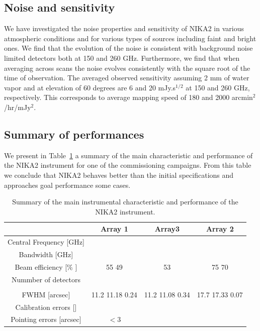 \documentclass[]{aa} %
\begin{document}
\subsection{Noise and sensitivity}
\label{Noise and sensitivity}
We have investigated the noise properties and sensitivity of NIKA2 in various atmospheric conditions and for various types of sources including faint and bright ones.
We find that the evolution of the noise is consistent with background noise limited detectors both at 150 and 260 GHz. Furthermore, we find that when averaging
across scans the noise evolves consistently with the square root of the time of observation.
The averaged observed sensitivity assuming 2 mm of water vapor 
and at elevation of 60 degrees are 6 and 20 mJy.s$^{1/2}$ at 150 and 260 GHz, respectively. This corresponds to average mapping speed of 180 and 2000 arcmin$^2$/hr/mJy$^2$.

\subsection{Summary of performances}
We present in Table~\ref{sumperf} a summary of the main characteristic and performance of the NIKA2 instrument for one of the commissioning campaigns. From this table we conclude that NIKA2 behaves better than the initial specifications \cite{ltd16:2016} and approaches goal performance some cases.


\begin{table}
\caption{Summary of the main instrumental characteristic and performance of the NIKA2 instrument. \label{sumperf}}
\begin{tabular}{|c|c|c|c|}
\hline
                          & Array 1 & Array3  & Array 2 \\
\hline
\hline

Central Frequency [GHz]   &         &         &         \\
Bandwidth         [GHz]   &   &     &       \\
Beam efficiency   [\% ]   & 55  49    & 53        &     75  70\\
Nummber of detectors      &         &         &         \\
                          &         &         &         \\ 
FWHM [arcsec]             &   11.2 11.18 0.24     &  11.2 11.08 0.34     &   17.7 17.33  0.07      
\\ 
Calibration errors []    &&& \\
Pointing errors    [arcsec]    & $<3$ && \\
\hline
\end{tabular}
\end{table}
\end{document}
